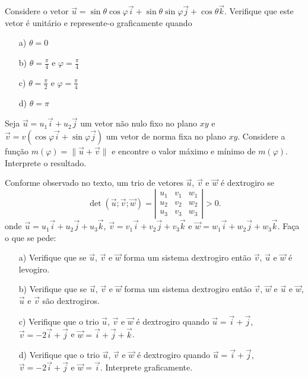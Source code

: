 \begin{exer} Considere o vetor $\vec{u}=\sin\theta \cos\varphi \vec{i}+ \sin\theta \sin\varphi \vec{j} + \cos\theta \vec{k}$. Verifique que este vetor é unitário e represente-o graficamente quando
\begin{itemize}
\item[a)] $\theta=0$
\item[b)] $\theta=\frac{\pi}{4}$ e $\varphi=\frac{\pi}{4}$
\item[c)] $\theta=\frac{\pi}{2}$ e $\varphi=\frac{\pi}{4}$
\item[d)] $\theta=\pi$

\end{itemize}
\end{exer}

\begin{exer}\label{probmaxmin} Seja $\vec{u}=u_1\vec{i} + u_2\vec{j}$ um vetor não nulo fixo no plano $xy$ e $\vec{v}=v\left(\cos\varphi \vec{i}+\sin\varphi \vec{j}\right)$ um vetor de norma fixa no plano $xy$. Considere a função $m(\varphi)=\|\vec{u}+\vec{v}\|$ e encontre o valor máximo e mínimo de $m(\varphi)$. Interprete o resultado.
\end{exer}

\begin{exer}\label{probdextro} Conforme observado no texto, um trio de vetores $\vec{u}$, $\vec{v}$ e $\vec{w}$ é dextrogiro se
\begin{equation*}
\det\left(\vec{u};\vec{v};\vec{w}\right)= \left|\begin{array}{ccc}
u_1&v_1&w_1\\
u_2&v_2&w_2\\
u_3&v_3&w_3
\end{array}
\right|>0.
\end{equation*}   
onde $\vec{u}=u_1\vec{i}+u_2\vec{j}+u_3\vec{k}$, $\vec{v}=v_1\vec{i}+v_2\vec{j}+v_3\vec{k}$ e $\vec{w}=w_1\vec{i}+w_2\vec{j}+w_3\vec{k}$. Faça o que se pede:
\begin{itemize}
\item [a)]Verifique que se $\vec{u}$, $\vec{v}$ e $\vec{w}$ forma um sistema dextrogiro então $\vec{v}$, $\vec{u}$ e $\vec{w}$ é levogiro.
\item [b)]Verifique que se $\vec{u}$, $\vec{v}$ e $\vec{w}$ forma um sistema dextrogiro então $\vec{v}$, $\vec{w}$ e $\vec{u}$ e $\vec{w}$, $\vec{u}$ e $\vec{v}$ são dextrogiros. 
\item [c)]Verifique que o trio $\vec{u}$, $\vec{v}$ e $\vec{w}$ é dextrogiro quando $\vec{u}=\vec{i}+\vec{j}$, $\vec{v}=-2\vec{i}+\vec{j}$ e $\vec{w}=\vec{i}+\vec{j}+\vec{k}$. 
\item [d)]Verifique que o trio $\vec{u}$, $\vec{v}$ e $\vec{w}$ é dextrogiro quando $\vec{u}=\vec{i}+\vec{j}$, $\vec{v}=-2\vec{i}+\vec{j}$ e $\vec{w}=\vec{i}$. Interprete graficamente.
\end{itemize}
\end{exer}

